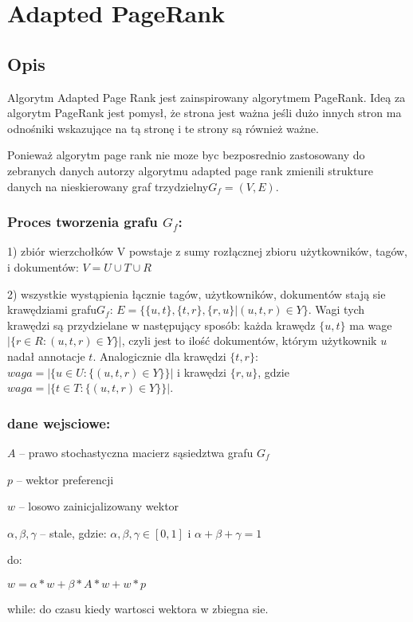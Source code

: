 \chapter{Adapted PageRank}
\section{Opis}

Algorytm Adapted Page Rank jest zainspirowany algorytmem PageRank. Ideą za algorytm PageRank jest pomysł, że strona jest ważna jeśli dużo innych stron ma odnośniki wskazujące na tą stronę i te strony są również ważne.

Ponieważ algorytm page rank nie moze byc bezposrednio zastosowany do zebranych danych autorzy algorytmu adapted page rank zmienili strukture danych na nieskierowany graf trzydzielny$ G_f = (V,E)$.

\subsection*{Proces tworzenia grafu $G_f$:}

1) zbiór wierzchołków V powstaje z sumy rozłącznej zbioru użytkowników, tagów, i dokumentów: $V = U \cup T \cup R$

2) wszystkie wystąpienia łącznie tagów, użytkowników, dokumentów  stają sie krawędziami grafu$ G_f$: $E = \{\{u,t\}, \{t,r\} ,\{r,u\} | (u,t,r) \in Y \}$. Wagi tych krawędzi są przydzielane w następujący sposób: każda krawędz $\{u,t\}$ ma wage $| \{r \in R : (u,t,r) \in Y\}|$, czyli jest to ilość dokumentów, którym użytkownik $u$ nadał annotacje $t$. Analogicznie dla krawędzi $\{t,r\}$: $waga=|\{u \in U : \{(u,t,r) \in Y\}\}|$ i krawędzi $\{r, u\}$, gdzie 
$waga=| \{t \in T : \{(u,t,r) \in Y \} \} |$.

\subsection*{dane wejsciowe:}
$A$ -- prawo stochastyczna macierz sąsiedztwa grafu $G_f$

$p$ -- wektor preferencji

$w$ -- losowo zainicjalizowany wektor

$\alpha, \beta, \gamma$ -- stale, gdzie: $\alpha, \beta, \gamma \in [0,1]$ i $\alpha + \beta + \gamma = 1$

do:

$w = \alpha * w + \beta * A * w + w * p$

while:
    do czasu kiedy wartosci wektora w zbiegna sie.

